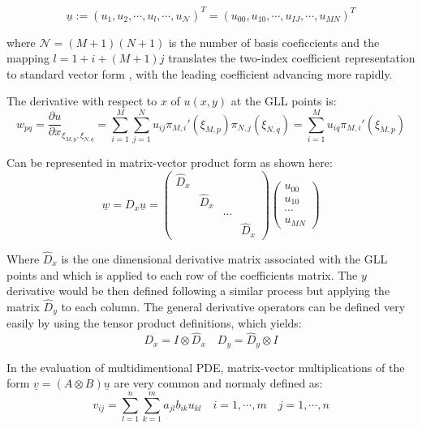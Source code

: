 \documentclass[
  a4paper,
  10pt]{article}
\begin{document}
\begin{equation}
    \underline{u} := (u_1,u_2,\cdots,u_l,\cdots,u_{\mathcal{N}})^{T}=(u_{00},u_{10},\cdots,u_{IJ},\cdots,u_{MN})^{T} 
\end{equation}

where \(\mathcal{N}=(M+1)(N+1)\) is the number of basis coeficcients and
the mapping \(l=1+i+(M+1)j\) translates the two-index coefficient
representation to standard vector form , with the leading coefficient
advancing more rapidly.

The derivative with respect to \(x\) of \(u(x,y)\) at the GLL points is:
\begin{equation}
    w_{pq}=\frac{\partial u}{\partial x}_{\xi_{M,p},\xi_{N,q}}=\sum_{i=1}^{M}\sum_{j=1}^{N} u_{ij} \pi_{M,i}'(\xi_{M,p}) \pi_{N,j}(\xi_{N,q})= \sum_{i=1}^{M} u_{iq} \pi_{M,i}'(\xi_{M,p})
\end{equation}

Can be represented in matrix-vector product form as shown here:
\begin{equation}
    \underline{w}=D_x\underline{u}=
    \begin{pmatrix}
    \hat{D}_x &           &        & \\
              & \hat{D}_x &        & \\
              &           & \cdots & \\
              &           &        & \hat{D}_x
    \end{pmatrix} 
    \begin{pmatrix}
    u_{00} \\
    u_{10} \\
    \cdots \\
    u_{MN}
    \end{pmatrix}
\end{equation}

Where \(\hat{D}_x\) is the one dimensional derivative matrix associated
with the GLL points and which is applied to each row of the coefficients
matrix. The \(y\) derivative would be then defined following a similar
process but applying the matrix \(\hat{D}_y\) to each column. The
general derivative operators can be defined very easily by using the
tensor product definitions, which yields: \begin{equation}
    D_x=I \otimes \hat{D}_x \quad  D_y= \hat{D}_y \otimes I
\end{equation}

In the evaluation of multidimentional PDE, matrix-vector multiplications
of the form \(\underline{v}=(A \otimes B)\underline{u}\) are very common
and normaly defined as: \begin{equation}
    v_{ij}=\sum_{l=1}^{n}\sum_{k=1}^{m} a_{jl} b_{ik} u_{kl} \quad i=1,\cdots,m \quad j=1,\cdots,n
\end{equation}
\end{document}
